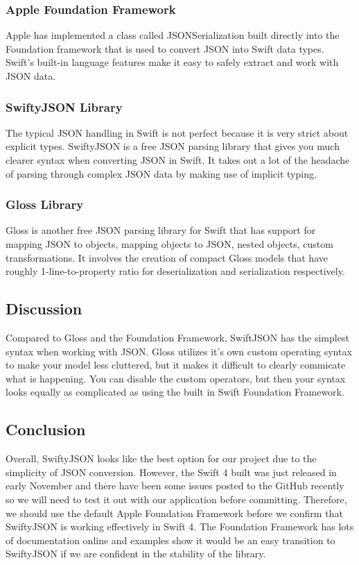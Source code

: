 \documentclass[onecolumn, draftclsnofoot,10pt, compsoc]{IEEEtran}
\begin{document}
\subsubsection{Apple Foundation Framework\cite{json}}
Apple has implemented a class called JSONSerialization built directly into the Foundation framework that is used to convert JSON into Swift data types.
Swift’s built-in language features make it easy to safely extract and work with JSON data.
\subsubsection{SwiftyJSON Library\cite{sjson}}
The typical JSON handling in Swift is not perfect because it is very strict about explicit types. 
SwiftyJSON is a free JSON parsing library that gives you much clearer syntax when converting JSON in Swift.
It takes out a lot of the headache of parsing through complex JSON data by making use of implicit typing.
\subsubsection{Gloss Library\cite{gloss}}
Gloss is another free JSON parsing library for Swift that has support for mapping JSON to objects, mapping objects to JSON, nested objects, custom transformations.
It involves the creation of compact Gloss models that have roughly 1-line-to-property ratio for deserialization and serialization respectively.
\subsection{Discussion}
Compared to Gloss and the Foundation Framework, SwiftJSON has the simplest syntax when working with JSON. 
Gloss utilizes it's own custom operating syntax to make your model less cluttered, but it makes it difficult to clearly commicate what is happening.
You can disable the custom operators, but then your syntax looks equally as complicated as using the built in Swift Foundation Framework.
\subsection{Conclusion}
Overall, SwiftyJSON looks like the best option for our project due to the simplicity of JSON conversion.
However, the Swift 4 built was just released in early November and there have been some issues posted to the GitHub recently so we will need to test it out with our application before committing. 
Therefore, we should use the default Apple Foundation Framework before we confirm that SwiftyJSON is working effectively in Swift 4.
The Foundation Framework has lots of documentation online and examples show it would be an easy transition to SwiftyJSON if we are confident in the stability of the library.



\end{document}
